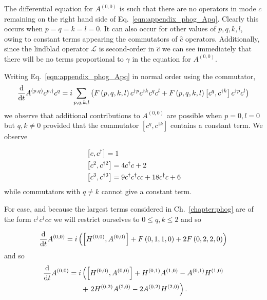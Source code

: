 The differential equation for $A^{\left(0, 0\right)}$ is such that there are no operators in mode $c$ remaining on the right hand side of Eq.~\ref{eqn:appendix_phog_Apq}. Clearly this occurs when $p=q=k=l=0$. It can also occur for other values of $p, q, k, l$, owing to constant terms appearing the commutators of $\hat{c}$ operators. Additionally, since the lindblad operator $\mathcal{L}$ is second-order in $\hat{c}$ we can see immediately that there will be no terms proportional to $\gamma$ in the equation for $A^{\left(0, 0\right)}$. 

Writing Eq.~\ref{eqn:appendix_phog_Apq} in normal order using the commutator,
\begin{equation}
\frac{\mathrm{d}}{\mathrm{d}t} A^{\left(p, q\right)} c^{p, \dagger} c^q = i \sum_{p, q, k, l}\left( F\left( p, q, k, l\right) c^{\dagger p} c^{\dagger k} c^q c^l + F\left(p, q, k, l\right)  \left[ c^{q}, c^{\dagger k}\right] c^{\dagger p} c^l \right)
\end{equation}
we observe that additional contributions to $A^{\left(0, 0\right)}$ are possible when $p=0, l=0$ but $q, k \ne 0$ provided that the commutator $\left[ c^q, c^{\dagger k}\right]$ contains a constant term. We observe

\begin{align}\label{eqn:phog_appendix_commutator}
&\left[ c, c^\dagger \right] = 1 \notag \\
%
&\left[ c^2, c^{\dagger 2} \right] = 4 c^\dagger c + 2 \notag \\
%
&\left[ c^3, c^{\dagger 3} \right] = 9 c^\dagger c^\dagger c c + 18 c^\dagger c + 6 \notag
\end{align}
while commutators with $q \ne k$ cannot give a constant term. 

For ease, and because the largest terms considered in Ch.~\ref{chapter:phog} are of the form $c^\dagger c^\dagger c c$ we will restrict ourselves to $0 \le q, k \le 2$ and so

\begin{equation}
\frac{\mathrm{d}}{\mathrm{d}t} A^{\left(0, 0\right)} = i \left( \left[ H^{\left(0, 0\right)}, A^{\left(0, 0\right)}\right] + F\left(0, 1, 1, 0\right) + 2 F\left(0, 2, 2, 0\right)\right) \notag
\end{equation}
and so 
\begin{align}
\ddt A^{\left(0, 0\right)} = i  &\left(\left[ H^{\left(0, 0\right)}, A^{\left(0, 0\right)}\right] + H^{\left(0, 1\right)} A^{\left(1, 0\right)} - A^{\left(0, 1\right)} H^{\left(1, 0\right)} \right. \notag \\
%
&+\left. 2 H^{\left(0, 2\right)} A^{\left(2, 0\right)} - 2 A^{\left(0, 2\right)} H^{\left(2, 0\right)} \right).
\end{align}






